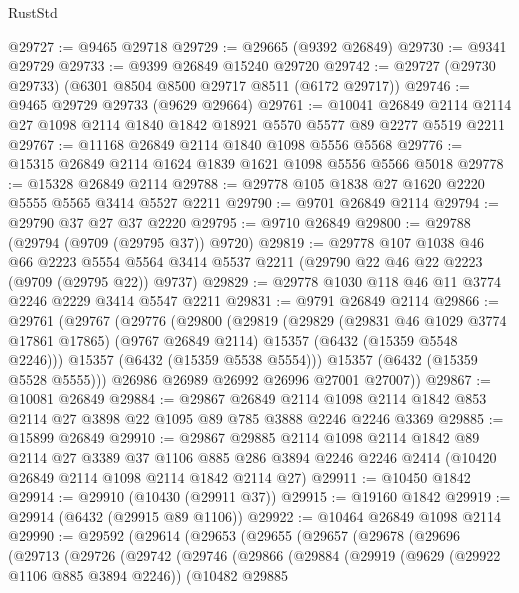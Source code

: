 \begin{lexlean}{RustStd}
\begin{coremodule}
@29727 := @9465 @29718
@29729 := @29665 (@9392 @26849)
@29730 := @9341 @29729
@29733 := @9399 @26849 @15240 @29720
@29742 := @29727 (@29730 @29733) (@6301 @8504 @8500 @29717 @8511 (@6172 @29717))
@29746 := @9465 @29729 @29733 (@9629 @29664)
@29761 := @10041
    @26849
    @2114
    @2114
    @27
    @1098
    @2114
    @1840
    @1842
    @18921
    @5570
    @5577
    @89
    @2277
    @5519
    @2211
@29767 := @11168 @26849 @2114 @1840 @1098 @5556 @5568
@29776 := @15315 @26849 @2114 @1624 @1839 @1621 @1098 @5556 @5566 @5018
@29778 := @15328 @26849 @2114
@29788 := @29778 @105 @1838 @27 @1620 @2220 @5555 @5565 @3414 @5527 @2211
@29790 := @9701 @26849 @2114
@29794 := @29790 @37 @27 @37 @2220
@29795 := @9710 @26849
@29800 := @29788 (@29794 (@9709 (@29795 @37)) @9720)
@29819 := @29778
    @107
    @1038
    @46
    @66
    @2223
    @5554
    @5564
    @3414
    @5537
    @2211
    (@29790 @22 @46 @22 @2223 (@9709 (@29795 @22)) @9737)
@29829 := @29778 @1030 @118 @46 @11 @3774 @2246 @2229 @3414 @5547 @2211
@29831 := @9791 @26849 @2114
@29866 := @29761
    (@29767
      (@29776
        (@29800
          (@29819
            (@29829
              (@29831 @46 @1029 @3774 @17861 @17865)
              (@9767 @26849 @2114)
              @15357
              (@6432 (@15359 @5548 @2246)))
            @15357
            (@6432 (@15359 @5538 @5554)))
          @15357
          (@6432 (@15359 @5528 @5555)))
        @26986
        @26989
        @26992
        @26996
        @27001
        @27007))
@29867 := @10081 @26849
@29884 := @29867
    @26849
    @2114
    @1098
    @2114
    @1842
    @853
    @2114
    @27
    @3898
    @22
    @1095
    @89
    @785
    @3888
    @2246
    @2246
    @3369
@29885 := @15899 @26849
@29910 := @29867
    @29885
    @2114
    @1098
    @2114
    @1842
    @89
    @2114
    @27
    @3389
    @37
    @1106
    @885
    @286
    @3894
    @2246
    @2246
    @2414
    (@10420 @26849 @2114 @1098 @2114 @1842 @2114 @27)
@29911 := @10450 @1842
@29914 := @29910 (@10430 (@29911 @37))
@29915 := @19160 @1842
@29919 := @29914 (@6432 (@29915 @89 @1106))
@29922 := @10464 @26849 @1098 @2114
@29990 := @29592
    (@29614
      (@29653
        (@29655
          (@29657
            (@29678
              (@29696
                (@29713
                  (@29726
                    (@29742
                      (@29746
                        (@29866
                          (@29884
                            (@29919
                              (@9629 (@29922 @1106 @885 @3894 @2246))
                              (@10482
                                @29885

\end{coremodule}
\end{lexlean}
